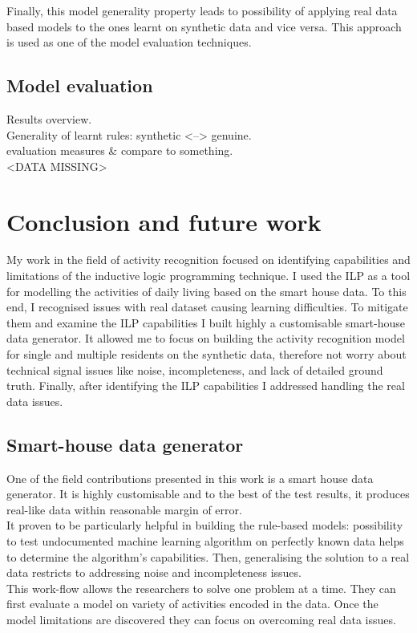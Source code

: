 \documentclass[10pt, a4paper, pdflatex, leqno, twoside, openright]{report}
\begin{document}
Finally, this model generality property leads to possibility of applying real data based models to the ones learnt on synthetic data and vice versa. This approach is used as one of the model evaluation techniques.

  \section{Model evaluation}
Results overview.\\
Generality of learnt rules: synthetic <--> genuine.\\
evaluation measures \& compare to something.\\

<DATA MISSING>

\chapter{Conclusion and future work\label{ch:summary}}
My work in the field of activity recognition focused on identifying capabilities and limitations of the inductive logic programming technique. I used the ILP as a tool for modelling the activities of daily living based on the smart house data. To this end, I recognised issues with real dataset causing learning difficulties. To mitigate them and examine the ILP capabilities I built highly a customisable smart-house data generator. It allowed me to focus on building the activity recognition model for single and multiple residents on the synthetic data, therefore not worry about technical signal issues like noise, incompleteness, and lack of detailed ground truth. Finally, after identifying the ILP capabilities I addressed handling the real data issues.

  \section{Smart-house data generator} %
One of the field contributions presented in this work is a smart house data generator. It is highly customisable and to the best of the test results, it produces real-like data within reasonable margin of error.\\
It proven to be particularly helpful in building the rule-based models: possibility to test undocumented machine learning algorithm on perfectly known data helps to determine the algorithm's capabilities. Then, generalising the solution to a real data restricts to addressing noise and incompleteness issues.\\
This work-flow allows the researchers to solve one problem at a time. They can first evaluate a model on variety of activities encoded in the data. Once the model limitations are discovered they can focus on overcoming real data issues.
\end{document}
